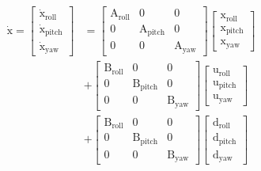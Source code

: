 \documentclass[conference]{IEEEtran}
\begin{document}
\begin{equation}
	\begin{split}
		\boldsymbol{{\mathrm{\dot x}}} = \begin{bmatrix}
			\boldsymbol{{\mathrm{\dot x_{\text{roll}}}}}\\
			\boldsymbol{{\mathrm{\dot x_{\text{pitch}}}}}\\
			\boldsymbol{{\mathrm{\dot x_{\text{yaw}}}}}
		\end{bmatrix} &= \begin{bmatrix}
			\boldsymbol{{\mathrm{A_{\text{roll}}}}} & 0 & 0\\
			0 & \boldsymbol{{\mathrm{A_{\text{pitch}}}}} & 0 \\
			0 & 0 & \boldsymbol{{\mathrm{A_{\text{yaw}}}}}
		\end{bmatrix} \begin{bmatrix}
			\boldsymbol{{\mathrm{x_{\text{roll}}}}}\\
			\boldsymbol{{\mathrm{x_{\text{pitch}}}}}\\
			\boldsymbol{{\mathrm{x_{\text{yaw}}}}}
		\end{bmatrix}
		\\[1em]
		& + \begin{bmatrix}
			\boldsymbol{{\mathrm{B_{\text{roll}}}}} & 0 & 0\\
			0 & \boldsymbol{{\mathrm{B_{\text{pitch}}}}} & 0 \\
			0 & 0 & \boldsymbol{{\mathrm{B_{\text{yaw}}}}}
		\end{bmatrix}
		\begin{bmatrix}
			\boldsymbol{{\mathrm{u_{\text{roll}}}}}\\
			\boldsymbol{{\mathrm{u_{\text{pitch}}}}}\\
			\boldsymbol{{\mathrm{u_{\text{yaw}}}}}
		\end{bmatrix}\\[1em]
		& + \begin{bmatrix}
			\boldsymbol{{\mathrm{B_{\text{roll}}}}} & 0 & 0\\
			0 & \boldsymbol{{\mathrm{B_{\text{pitch}}}}} & 0 \\
			0 & 0 & \boldsymbol{{\mathrm{B_{\text{yaw}}}}}
		\end{bmatrix} \begin{bmatrix}
			\boldsymbol{{\mathrm{d_{\text{roll}}}}}\\
			\boldsymbol{{\mathrm{d_{\text{pitch}}}}}\\
			\boldsymbol{{\mathrm{d_{\text{yaw}}}}}
		\end{bmatrix}
	\end{split}
\end{equation}
\end{document}
